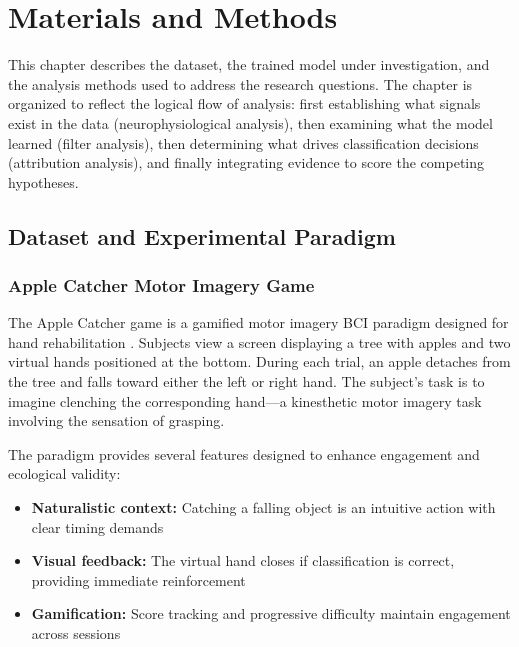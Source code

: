 \chapter{Materials and Methods}
\label{ch:methods}

This chapter describes the dataset, the trained model under investigation, and the analysis methods used to address the research questions. The chapter is organized to reflect the logical flow of analysis: first establishing what signals exist in the data (neurophysiological analysis), then examining what the model learned (filter analysis), then determining what drives classification decisions (attribution analysis), and finally integrating evidence to score the competing hypotheses.


\section{Dataset and Experimental Paradigm}
\label{sec:methods_dataset}

\subsection{Apple Catcher Motor Imagery Game}
\label{subsec:methods_apple_catcher}

The Apple Catcher game is a gamified motor imagery BCI paradigm designed for hand rehabilitation \cite{skredsvig2025apple}. Subjects view a screen displaying a tree with apples and two virtual hands positioned at the bottom. During each trial, an apple detaches from the tree and falls toward either the left or right hand. The subject's task is to imagine clenching the corresponding hand—a kinesthetic motor imagery task involving the sensation of grasping.

The paradigm provides several features designed to enhance engagement and ecological validity:

\begin{itemize}
    \item \textbf{Naturalistic context:} Catching a falling object is an intuitive action with clear timing demands
    \item \textbf{Visual feedback:} The virtual hand closes if classification is correct, providing immediate reinforcement
    \item \textbf{Gamification:} Score tracking and progressive difficulty maintain engagement across sessions
\end{itemize}

